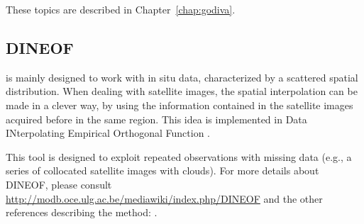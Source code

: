 These topics are described in Chapter~\ref{chap:godiva}.


\subsection{DINEOF\label{sec:DINEOF}}

\diva is mainly designed to work with in situ data, characterized by a scattered spatial distribution. When dealing with satellite images, the spatial interpolation can be made in a clever way, by using the information contained in the satellite images acquired before in the same region. This idea is implemented in Data INterpolating Empirical Orthogonal Function \citep[DINEOF;][]{BECKERS03,ALVERA05}.

This tool is designed to exploit repeated observations with missing data (e.g., a series of collocated satellite images with clouds). 
For more details about DINEOF, please consult \url{http://modb.oce.ulg.ac.be/mediawiki/index.php/DINEOF} and the other references describing the method: \cite{ALVERA05,ALVERA07,ALVERA09,BECKERS06}.


